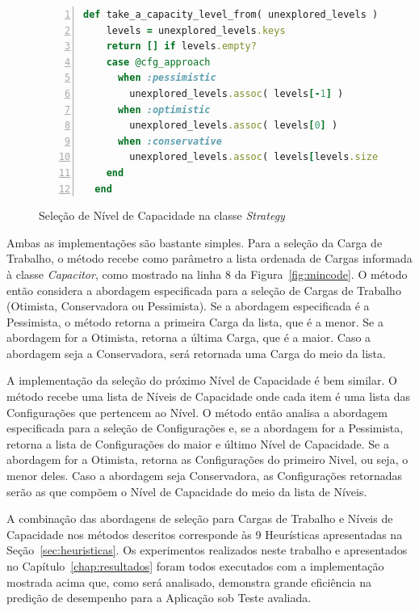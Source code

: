 \begin{figure}[h]
  \caption{\label{fig:strategy_capacity_code}Seleção de Nível de Capacidade na classe \emph{Strategy}}
  \begin{lstlisting}[language=Ruby,linewidth=\textwidth,xleftmargin=.04\textwidth, numbers=left]
  def take_a_capacity_level_from( unexplored_levels )
    levels = unexplored_levels.keys
    return [] if levels.empty?
    case @cfg_approach
      when :pessimistic
        unexplored_levels.assoc( levels[-1] )
      when :optimistic
        unexplored_levels.assoc( levels[0] )
      when :conservative
        unexplored_levels.assoc( levels[levels.size / 2] )
    end
  end
  \end{lstlisting}
\end{figure}

Ambas as implementações são bastante simples. Para a seleção da Carga de Trabalho,
o método recebe como parâmetro a lista ordenada de Cargas informada à classe 
\emph{Capacitor}, como mostrado na linha 8 da Figura~\ref{fig:mincode}. O método 
então considera a abordagem especificada para a seleção de Cargas de Trabalho 
(Otimista, Conservadora ou Pessimista). Se a abordagem especificada é a Pessimista, 
o método retorna a primeira Carga da lista, que é a menor. Se a abordagem for a
Otimista, retorna a última Carga, que é a maior. Caso a abordagem seja a Conservadora,
será retornada uma Carga do meio da lista.

A implementação da seleção do próximo Nível de Capacidade é bem similar. O método
recebe uma lista de Níveis de Capacidade onde cada item é uma lista das Configurações
que pertencem ao Nível. O método então analisa a abordagem especificada para a
seleção de Configurações e, se a abordagem for a Pessimista, retorna a lista de 
Configurações do maior e último Nível de Capacidade. Se a abordagem for a Otimista, 
retorna as Configurações do primeiro Nivel, ou seja, o menor deles. Caso a abordagem
seja Conservadora, as Configurações retornadas serão as que compõem o Nível de 
Capacidade do meio da lista de Níveis.    

A combinação das abordagens de seleção para Cargas de Trabalho e Níveis de 
Capacidade nos métodos descritos corresponde às 9 Heurísticas apresentadas na
Seção~\ref{sec:heuristicas}. Os experimentos realizados neste trabalho e 
apresentados no Capítulo~\ref{chap:resultados} foram todos executados com a 
implementação mostrada acima que, como será analisado, demonstra grande eficiência
na predição de desempenho para a Aplicação sob Teste avaliada.
 
